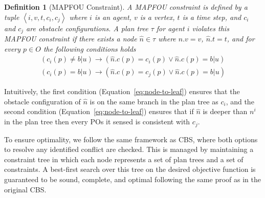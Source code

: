 \documentclass[letterpaper]{article} %
\newcommand{\unknown}{\textit{b}|\textit{u}}
\newcommand{\pos}{POs\xspace}
\newcommand{\tuple}[1]{\ensuremath{\left \langle #1 \right \rangle }}
\newtheorem{definition}{Definition}
\begin{document}
\begin{definition}[MAPFOU Constraint]
A MAPFOU constraint is defined by a tuple $\tuple{i,v,t,c_i,c_j}$ 
where $i$ is an agent, 
$v$ is a vertex,
$t$ is a time step, 
and $c_i$ and $c_j$ are obstacle configurations. 
A plan tree $\tau$ for agent $i$ violates this MAPFOU constraint if there exists a node $\hat{n}\in\tau$ where $\hat{n}.v=v$,  $\hat{n}.t=t$, and for every $p\in O$ the following conditions holds 
\begin{eqnarray}
\left(c_i(p)\neq\unknown\right)\rightarrow \left(\hat{n}.c(p)=c_i(p)\vee \hat{n}.c(p)=\unknown\right) \label{eq:root-to-node}
\\
\left(c_i(p)=\unknown\right)\rightarrow \left(\hat{n}.c(p)=c_j(p)\vee \hat{n}.c(p)=\unknown\right)  \label{eq:node-to-leaf}
\end{eqnarray}
\label{def:mapfou-constraint}
\end{definition}
Intuitively, the first condition (Equation~\ref{eq:node-to-leaf}) ensures that the obstacle configuration of $\hat{n}$ is on the same branch in the plan tree as $c_i$, 
and the second condition (Equation~\ref{eq:node-to-leaf}) ensures that 
if $\hat{n}$ is deeper than $n^i$ in the plan tree then every \pos it sensed is consistent with $c_j$. 


To ensure optimality, we follow the same framework as CBS, where both options to resolve any identified conflict are checked. This is managed by maintaining a constraint tree in which each node represents a set of plan trees and a set of constraints. A best-first search over this tree on the desired objective function is guaranteed to be sound, complete, and optimal following the same proof as in the original CBS. 
\end{document}
